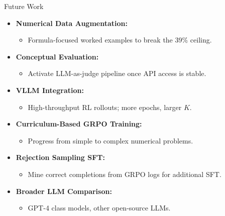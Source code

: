 \documentclass[10pt]{beamer}
\begin{document}
\begin{frame}{Future Work}
\large
\begin{itemize}
    \item<1-> \textbf{Numerical Data Augmentation:}
    \begin{itemize}
        \item Formula-focused worked examples to break the 39\% ceiling.
    \end{itemize}

    \vspace{0.2cm}

    \item<1-> \textbf{Conceptual Evaluation:}
    \begin{itemize}
        \item Activate LLM-as-judge pipeline once API access is stable.
    \end{itemize}

    \vspace{0.2cm}

    \item<1-> \textbf{VLLM Integration:}
    \begin{itemize}
        \item High-throughput RL rollouts; more epochs, larger $K$.
    \end{itemize}

    \vspace{0.2cm}

    \item<2-> \textbf{Curriculum-Based GRPO Training:}
    \begin{itemize}
        \item Progress from simple to complex numerical problems.
    \end{itemize}

    \vspace{0.2cm}

    \item<2-> \textbf{Rejection Sampling SFT:}
    \begin{itemize}
        \item Mine correct completions from GRPO logs for additional SFT.
    \end{itemize}

    \vspace{0.2cm}

    \item<2-> \textbf{Broader LLM Comparison:}
    \begin{itemize}
        \item GPT-4 class models, other open-source LLMs.
    \end{itemize}
\end{itemize}
\end{frame}
\end{document}
